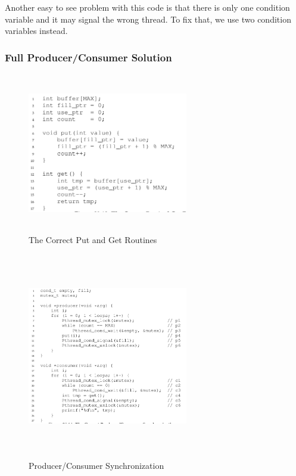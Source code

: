 Another easy to see problem with this code is that there is only one condition
variable and it may signal the wrong thread. To fix that, we use two condition
variables instead.

\subsubsection{Full Producer/Consumer Solution}

\begin{figure}[h!]
    \begin{center}
        \includegraphics[width=7cm, height=7cm]{img/3013.png}
        \caption{The Correct Put and Get Routines}
    \end{center}
\end{figure}

\begin{figure}[h!]
    \begin{center}
        \includegraphics[width=7cm, height=9cm]{img/3014.png}
        \caption{Producer/Consumer Synchronization}
    \end{center}
\end{figure}

